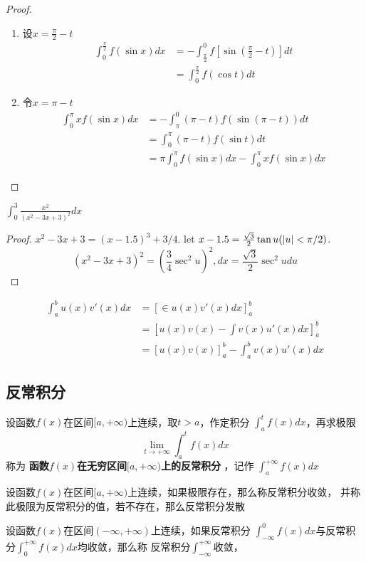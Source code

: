 \documentclass[11pt]{article}
\begin{document}
\begin{proof}
\begin{enumerate}
\item 设\(x=\frac{\pi}{2}-t\)
\begin{align*}
\int_0^{\frac{\pi}{2}}f(\sin x)dx&=-\int_{\frac{\pi}{2}}^0f[\sin(\frac{\pi}{2}-t)]dt\\
&=\int_0^{\frac{\pi}{2}}f(\cos t)dt
\end{align*}
\item 令\(x=\pi-t\)
\begin{align*}
\int_0^\pi xf(\sin x)dx&=-\int_\pi^0(\pi-t)f(\sin(\pi-t))dt\\
&=\int_0^\pi(\pi-t)f(\sin t)dt\\
&=\pi\int_0^\pi f(\sin x)dx-\int_0^\pi xf(\sin x)dx
\end{align*}
\end{enumerate}
\end{proof}

\begin{proposition}[]
\(\int_0^3\frac{x^2}{(x^2-3x+3)^2}dx\)
\end{proposition}

\begin{proof}
\(x^2-3x+3=(x-1.5)^3+3/4\). let \(x-1.5=\frac{\sqrt{3}}{2}\tan
   u(\abs{u}<\pi/2)\).
\begin{equation*}
(x^2-3x+3)^2=(\frac{3}{4}\sec^2u)^2,dx=\frac{\sqrt{3}}{2}\sec^2udu
\end{equation*}
\end{proof}

\begin{align*}
\int_a^bu(x)v'(x)dx&=\left[\in u(x)v'(x)dx
\right]^b_a\\
&=\left[u(x)v(x)-\int v(x)u'(x)dx\right]_a^b\\
&=[u(x)v(x)]^b_a-\int^b_av(x)u'(x)dx
\end{align*}
\subsection{反常积分}
\label{sec:org71bf6f9}
设函数\(f(x)\)在区间\([a,+\infty)\)上连续，取\(t>a\)，作定积分
\(\int_a^tf(x)dx\)，再求极限
\begin{equation*}
\lim_{t\to+\infty}\int^t_af(x)dx
\end{equation*}
称为 \textbf{函数\(f(x)\)在无穷区间\([a,+\infty)\)上的反常积分} ，记作
\(\int_a^{+\infty}f(x)dx\)

\begin{definition}[]
设函数\(f(x)\)在区间\([a,+\infty)\)上连续，如果极限存在，那么称反常积分收敛，
并称此极限为反常积分的值，若不存在，那么反常积分发散

设函数\(f(x)\)在区间\((-\infty,+\infty)\)上连续，如果反常积分
\(\int_{-\infty}^0f(x)dx\)与反常积分\(\int_0^{+\infty}f(x)dx\)均收敛，那么称
反常积分\(\int_{-\infty}^{+\infty}\)收敛，
\end{definition}
\end{document}
